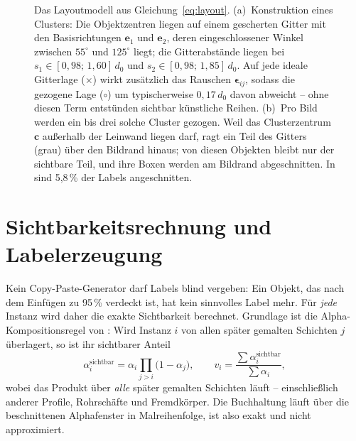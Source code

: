 \begin{figure}[htbp]
\caption[Layoutmodell]{Das Layoutmodell aus Gleichung~\eqref{eq:layout}.
(a)~Konstruktion eines Clusters: Die Objektzentren liegen auf einem gescherten
Gitter mit den Basisrichtungen $\mathbf{e}_1$ und $\mathbf{e}_2$, deren
eingeschlossener Winkel zwischen $55^\circ$ und $125^\circ$ liegt; die
Gitterabstände liegen bei $s_1 \in [0{,}98;\,1{,}60]\,d_0$ und
$s_2 \in [0{,}98;\,1{,}85]\,d_0$. Auf jede ideale Gitterlage ($\times$) wirkt
zusätzlich das Rauschen $\boldsymbol{\epsilon}_{ij}$, sodass die gezogene Lage
($\circ$) um typischerweise $0{,}17\,d_0$ davon abweicht -- ohne diesen Term
entstünden sichtbar künstliche Reihen. (b)~Pro Bild werden ein bis drei solche
Cluster gezogen. Weil das Clusterzentrum $\mathbf{c}$ außerhalb der Leinwand
liegen darf, ragt ein Teil des Gitters (grau) über den Bildrand hinaus; von
diesen Objekten bleibt nur der sichtbare Teil, und ihre Boxen werden am
Bildrand abgeschnitten. In  sind 5,8\,\% der Labels angeschnitten.}
\label{abb:layout}
\end{figure}

\section{Sichtbarkeitsrechnung und Labelerzeugung}
\label{sec:sichtbarkeit}

Kein Copy-Paste-Generator darf Labels blind vergeben: Ein Objekt, das nach dem
Einfügen zu 95\,\% verdeckt ist, hat kein sinnvolles Label mehr. Für
\emph{jede} Instanz wird daher die exakte Sichtbarkeit berechnet. Grundlage ist
die Alpha-Kompositionsregel von \textcite{porter1984}: Wird Instanz $i$ von allen
später gemalten Schichten $j$ überlagert, so ist ihr sichtbarer Anteil
\begin{equation}
\alpha_i^{\text{sichtbar}} = \alpha_i \prod_{j > i} \big(1 - \alpha_j\big),
\qquad
v_i = \frac{\textstyle\sum \alpha_i^{\text{sichtbar}}}{\textstyle\sum \alpha_i},
\label{eq:sichtbarkeit}
\end{equation}
wobei das Produkt über \emph{alle} später gemalten Schichten läuft --
einschließlich anderer Profile, Rohrschäfte und Fremdkörper. Die Buchhaltung
läuft über die beschnittenen Alphafenster in Malreihenfolge, ist also exakt und
nicht approximiert.

